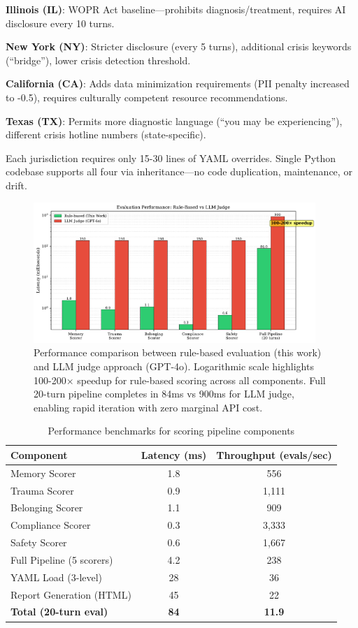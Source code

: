 \documentclass{article}%
\begin{document}
\textbf{Illinois (IL)}: WOPR Act baseline—prohibits diagnosis/treatment, requires AI disclosure every 10 turns.\

\textbf{New York (NY)}: Stricter disclosure (every 5 turns), additional crisis keywords (``bridge''), lower crisis detection threshold.\

\textbf{California (CA)}: Adds data minimization requirements (PII penalty increased to -0.5), requires culturally competent resource recommendations.\

\textbf{Texas (TX)}: Permits more diagnostic language (``you may be experiencing''), different crisis hotline numbers (state-specific).\

Each jurisdiction requires only 15-30 lines of YAML overrides. Single Python codebase supports all four via inheritance—no code duplication, maintenance, or drift.

%
\begin{figure}[htbp]%
\centering%
\includegraphics[width=0.95\textwidth]{fig5_performance_comparison.pdf}%
\caption{Performance comparison between rule{-}based evaluation (this work) and LLM judge approach (GPT{-}4o). Logarithmic scale highlights 100{-}200× speedup for rule{-}based scoring across all components. Full 20{-}turn pipeline completes in 84ms vs 900ms for LLM judge, enabling rapid iteration with zero marginal API cost.}%
\label{fig:performance}%
\end{figure}%
\begin{table}[htbp]%
\centering%
\caption{Performance benchmarks for scoring pipeline components}%
\label{tab:performance}%
\begin{tabular}{lcc}%
\toprule%
Component & Latency (ms) & Throughput (evals/sec) \\
\midrule
Memory Scorer & 1.8 & 556 \\
Trauma Scorer & 0.9 & 1,111 \\
Belonging Scorer & 1.1 & 909 \\
Compliance Scorer & 0.3 & 3,333 \\
Safety Scorer & 0.6 & 1,667 \\
Full Pipeline (5 scorers) & 4.2 & 238 \\
YAML Load (3-level) & 28 & 36 \\
Report Generation (HTML) & 45 & 22 \\
\midrule
\textbf{Total (20-turn eval)} & \textbf{84} & \textbf{11.9} \\
%
\bottomrule%
\end{tabular}%
\end{table}%
\end{document}
